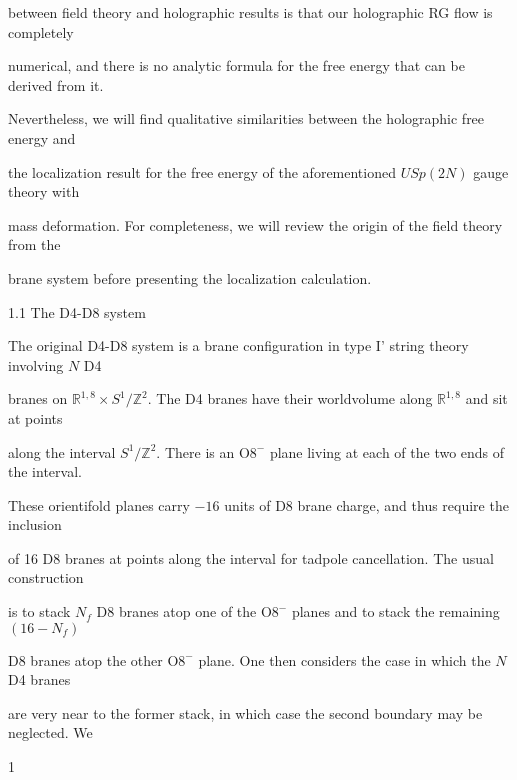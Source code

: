\documentclass[a4paper,12pt]{article}
\begin{document}
between field theory and holographic results is that our holographic RG flow is completely

numerical, and there is no analytic formula for the free energy that can be derived from it.

Nevertheless, we will find qualitative similarities between the holographic free energy and

the localization result for the free energy of the aforementioned $USp(2N)$ gauge theory with

mass deformation. For completeness, we will review the origin of the field theory from the

brane system before presenting the localization calculation.

1.1 The D4-D8 system

The original D4-D8 system is a brane configuration in type I' string theory involving $N$ D4

branes on $\mathbb{R}^{1,8}\times S^{1}/\mathbb{Z}^{2}$. The D4 branes have their worldvolume along $\mathbb{R}^{1,8}$ and sit at points

along the interval $S^{1}/\mathbb{Z}^{2}$. There is an $\mathrm{O}8^{-}$ plane living at each of the two ends of the interval.

These orientifold planes carry $-16$ units of D8 brane charge, and thus require the inclusion

of 16 D8 branes at points along the interval for tadpole cancellation. The usual construction

is to stack $N_{f}$ D8 branes atop one of the $\mathrm{O}8^{-}$ planes and to stack the remaining $(16-N_{f})$

D8 branes atop the other $\mathrm{O}8^{-}$ plane. One then considers the case in which the $N$ D4 branes

are very near to the former stack, in which case the second boundary may be neglected. We

1
\end{document}
